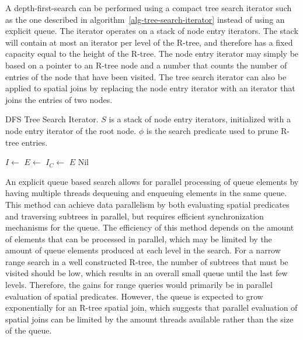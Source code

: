 A depth-first-search can be performed using a compact tree search iterator such as the one described in algorithm~\ref{alg-tree-search-iterator} instead of using an explicit queue. The iterator operates on a stack of node entry iterators. The stack will contain at most an iterator per level of the R-tree, and therefore has a fixed capacity equal to the height of the R-tree. The node entry iterator may simply be based on a pointer to an R-tree node and a number that counts the number of entries of the node that have been visited. The tree search iterator can also be applied to spatial joins by replacing the node entry iterator with an iterator that joins the entries of two nodes.

\begin{algorithm}
  \caption{DFS Tree Search Iterator. \(S\) is a stack of node entry iterators, initialized with a node entry iterator of the root node. \(\phi\) is the search predicate used to prune R-tree entries.}
  \label{alg-tree-search-iterator}
  \begin{algorithmic}[1]
        \State \(I \leftarrow\) 
        \State \(E \leftarrow\) 
          \State {}
        \Else
            \State \(I_C \leftarrow\) 
            \State {}
          \Else
            \State \Return \(E\)
          \EndIf
        \EndIf
      \EndWhile
      \State \Return Nil
    \EndFunction
  \end{algorithmic}
\end{algorithm}

An explicit queue based search allows for parallel processing of queue elements by having multiple threads dequeuing and enqueuing elements in the same queue. This method can achieve data parallelism by both evaluating spatial predicates and traversing subtrees in parallel, but requires efficient synchronization mechanisms for the queue. The efficiency of this method depends on the amount of elements that can be processed in parallel, which may be limited by the amount of queue elements produced at each level in the search. For a narrow range search in a well constructed R-tree, the number of subtrees that must be visited should be low, which results in an overall small queue until the last few levels. Therefore, the gains for range queries would primarily be in parallel evaluation of spatial predicates. However, the queue is expected to grow exponentially for an R-tree spatial join, which suggests that parallel evaluation of spatial joins can be limited by the amount threads available rather than the size of the queue.

